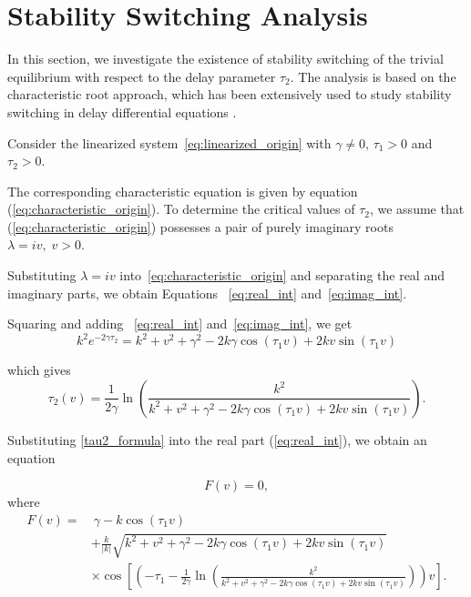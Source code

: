 \documentclass[11pt]{article}
\theoremstyle{remark}
\begin{document}
{

\section{Stability Switching Analysis}
\label{sec:switching}

In this section, we investigate the existence of stability switching of the trivial equilibrium with respect to the delay parameter $\tau_2$. The analysis is based on the characteristic root approach, which has been extensively used to study stability switching in delay differential equations \cite{grossman1982discrete,beretta2002geometric,bhalekar2016stability,bhalekar2024stability}.

Consider the linearized system~\eqref{eq:linearized_origin}
with $\gamma\neq0$, $\tau_1>0$ and $\tau_2>0$.

The corresponding characteristic equation is given by equation (\ref{eq:characteristic_origin}). To determine the critical values of $\tau_2$, we assume that (\ref{eq:characteristic_origin}) possesses a pair of purely imaginary roots
$
\lambda=iv,\;v>0.
$

Substituting $\lambda=iv$ into~\eqref{eq:characteristic_origin} and separating the real and imaginary parts, we obtain Equations ~\eqref{eq:real_int} and~\eqref{eq:imag_int}.

Squaring and adding ~\eqref{eq:real_int} and~\eqref{eq:imag_int}, we get
\begin{equation}
k^2e^{-2\gamma\tau_2}
=
k^2+v^2+\gamma^2
-2k\gamma\cos(\tau_1v)
+2kv\sin(\tau_1v)
\end{equation}

which gives
\begin{equation}
\tau_2(v)
=
\frac{1}{2\gamma}
\ln
\left(
\frac{k^2}
{k^2+v^2+\gamma^2
-2k\gamma\cos(\tau_1v)
+2kv\sin(\tau_1v)}
\right).
\label{tau2_formula}
\end{equation}

Substituting \eqref{tau2_formula} into the real part (\ref{eq:real_int}), we obtain an equation 

\begin{equation}
F(v)=0,
\label{Fv}
\end{equation}
where
\begin{align}
F(v)
=&\
\gamma-k\cos(\tau_1v)
\nonumber\\
&
+\frac{k}{|k|}
\sqrt{
k^2+v^2+\gamma^2
-2k\gamma\cos(\tau_1v)
+2kv\sin(\tau_1v)}
\nonumber\\
&\times
\cos\left[
\left(
-\tau_1
-
\frac{1}{2\gamma}
\ln
\left(
\frac{k^2}
{k^2+v^2+\gamma^2
-2k\gamma\cos(\tau_1v)
+2kv\sin(\tau_1v)}
\right)
\right)v
\right].
\end{align}

}
\end{document}
